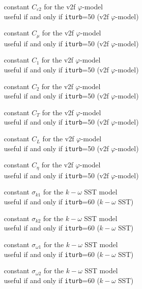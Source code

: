 {constant $C_{\varepsilon 2}$ for the v2f $\varphi$-model\\
useful if and only if {\tt iturb}=50
(v2f $\varphi$-model)}

{constant $C_\mu$ for the v2f $\varphi$-model\\
useful if and only if {\tt iturb}=50
(v2f $\varphi$-model)}

{constant $C_1$ for the v2f $\varphi$-model\\
useful if and only if {\tt iturb}=50
(v2f $\varphi$-model)}

{constant $C_2$ for the v2f $\varphi$-model\\
useful if and only if {\tt iturb}=50
(v2f $\varphi$-model)}

{constant $C_T$ for the v2f $\varphi$-model\\
useful if and only if {\tt iturb}=50
(v2f $\varphi$-model)}

{constant $C_L$ for the v2f $\varphi$-model\\
useful if and only if {\tt iturb}=50
(v2f $\varphi$-model)}

{constant $C_\eta$ for the v2f $\varphi$-model\\
useful if and only if {\tt iturb}=50
(v2f $\varphi$-model)}


{constant $\sigma_{k1}$ for the $k-\omega$ SST model\\
useful if and only if {\tt iturb}=60
($k-\omega$ SST)}

{constant $\sigma_{k2}$ for the $k-\omega$ SST model\\
useful if and only if {\tt iturb}=60
($k-\omega$ SST)}

{constant $\sigma_{\omega 1}$ for the $k-\omega$ SST model\\
useful if and only if {\tt iturb}=60
($k-\omega$ SST)}

{constant $\sigma_{\omega 2}$ for the $k-\omega$ SST model\\
useful if and only if {\tt iturb}=60
($k-\omega$ SST)}


